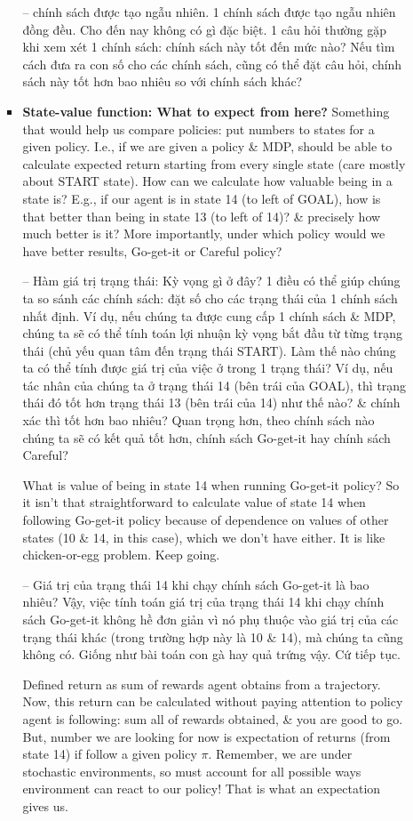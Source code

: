 \documentclass{article}
\begin{document}
\begin{itemize}
\begin{itemize}
\begin{itemize}
            -- { chính sách được tạo ngẫu nhiên.} 1 chính sách được tạo ngẫu nhiên đồng đều. Cho đến nay không có gì đặc biệt. 1 câu hỏi thường gặp khi xem xét 1 chính sách: chính sách này tốt đến mức nào? Nếu tìm cách đưa ra con số cho các chính sách, cũng có thể đặt câu hỏi, chính sách này tốt hơn bao nhiêu so với chính sách khác?
            \item {\bf State-value function: What to expect from here?} Something that would help us compare policies: put numbers to states for a given policy. I.e., if we are given a policy \& MDP, should be able to calculate expected return starting from every single state (care mostly about START state). How can we calculate how valuable being in a state is? E.g., if our agent is in state 14 (to left of GOAL), how is that better than being in state 13 (to left of 14)? \& precisely how much better is it? More importantly, under which policy would we have better results, Go-get-it or Careful policy?

            -- {\sf Hàm giá trị trạng thái: Kỳ vọng gì ở đây?} 1 điều có thể giúp chúng ta so sánh các chính sách: đặt số cho các trạng thái của 1 chính sách nhất định. Ví dụ, nếu chúng ta được cung cấp 1 chính sách \& MDP, chúng ta sẽ có thể tính toán lợi nhuận kỳ vọng bắt đầu từ từng trạng thái (chủ yếu quan tâm đến trạng thái START). Làm thế nào chúng ta có thể tính được giá trị của việc ở trong 1 trạng thái? Ví dụ, nếu tác nhân của chúng ta ở trạng thái 14 (bên trái của GOAL), thì trạng thái đó tốt hơn trạng thái 13 (bên trái của 14) như thế nào? \& chính xác thì tốt hơn bao nhiêu? Quan trọng hơn, theo chính sách nào chúng ta sẽ có kết quả tốt hơn, chính sách Go-get-it hay chính sách Careful?

            {\sf What is value of being in state 14 when running Go-get-it policy?} So it isn't that straightforward to calculate value of state 14 when following Go-get-it policy because of dependence on values of other states (10 \& 14, in this case), which we don't have either. It is like chicken-or-egg problem. Keep going.

            -- {\sf Giá trị của trạng thái 14 khi chạy chính sách Go-get-it là bao nhiêu?} Vậy, việc tính toán giá trị của trạng thái 14 khi chạy chính sách Go-get-it không hề đơn giản vì nó phụ thuộc vào giá trị của các trạng thái khác (trong trường hợp này là 10 \& 14), mà chúng ta cũng không có. Giống như bài toán con gà hay quả trứng vậy. Cứ tiếp tục.

            Defined return as sum of rewards agent obtains from a trajectory. Now, this return can be calculated without paying attention to policy agent is following: sum all of rewards obtained, \& you are good to go. But, number we are looking for now is expectation of returns (from state 14) if follow a given policy $\pi$. Remember, we are under stochastic environments, so must account for all possible ways environment can react to our policy! That is what an expectation gives us.


\end{itemize}
\end{itemize}
\end{itemize}
\end{document}
